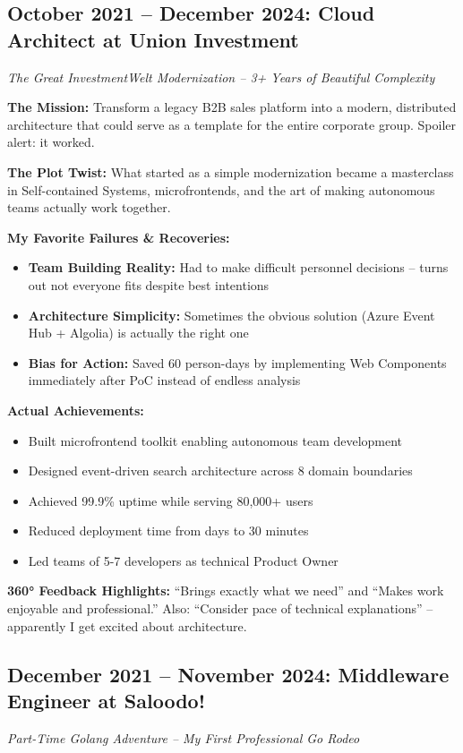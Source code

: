 \documentclass[10pt,a4paper]{article}
\begin{document}
\subsection{October 2021 -- December 2024: Cloud Architect at Union Investment}
\textit{The Great InvestmentWelt Modernization -- 3+ Years of Beautiful Complexity}

\textbf{The Mission:} Transform a legacy B2B sales platform into a modern, distributed architecture that could serve as a template for the entire corporate group. Spoiler alert: it worked.

\textbf{The Plot Twist:} What started as a simple modernization became a masterclass in Self-contained Systems, microfrontends, and the art of making autonomous teams actually work together.

\textbf{My Favorite Failures \& Recoveries:}
\begin{itemize}
    \item \textbf{Team Building Reality:} Had to make difficult personnel decisions -- turns out not everyone fits despite best intentions
    \item \textbf{Architecture Simplicity:} Sometimes the obvious solution (Azure Event Hub + Algolia) is actually the right one
    \item \textbf{Bias for Action:} Saved 60 person-days by implementing Web Components immediately after PoC instead of endless analysis
\end{itemize}

\textbf{Actual Achievements:}
\begin{itemize}
    \item Built microfrontend toolkit enabling autonomous team development
    \item Designed event-driven search architecture across 8 domain boundaries
    \item Achieved 99.9\% uptime while serving 80,000+ users
    \item Reduced deployment time from days to 30 minutes
    \item Led teams of 5-7 developers as technical Product Owner
\end{itemize}

\textbf{360° Feedback Highlights:} ``Brings exactly what we need'' and ``Makes work enjoyable and professional.'' Also: ``Consider pace of technical explanations'' -- apparently I get excited about architecture.

\subsection{December 2021 -- November 2024: Middleware Engineer at Saloodo!}
\textit{Part-Time Golang Adventure -- My First Professional Go Rodeo}
\end{document}
